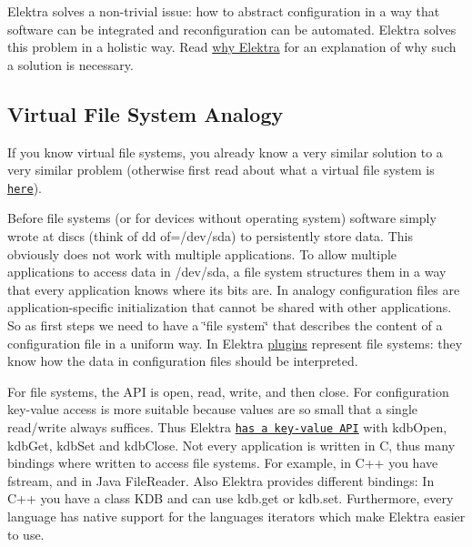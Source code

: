 Elektra solves a non-\/trivial issue\+: how to abstract configuration in a way that software can be integrated and reconfiguration can be automated. Elektra solves this problem in a holistic way. Read \hyperlink{doc_WHY_md}{why Elektra} for an explanation of why such a solution is necessary.

\subsection*{Virtual File System Analogy}

If you know virtual file systems, you already know a very similar solution to a very similar problem (otherwise first read about what a virtual file system is \href{https://en.wikipedia.org/wiki/Virtual_file_system}{\tt here}).

Before file systems (or for devices without operating system) software simply wrote at discs (think of {\ttfamily dd of=/dev/sda}) to persistently store data. This obviously does not work with multiple applications. To allow multiple applications to access data in {\ttfamily /dev/sda}, a file system structures them in a way that every application knows where its bits are. In analogy configuration files are application-\/specific initialization that cannot be shared with other applications. So as first steps we need to have a \char`\"{}file system\char`\"{} that describes the content of a configuration file in a uniform way. In Elektra \hyperlink{md_src_plugins_README_src_plugins_README_md}{plugins} represent file systems\+: they know how the data in configuration files should be interpreted.

For file systems, the A\+PI is {\ttfamily open}, {\ttfamily read}, {\ttfamily write}, and then {\ttfamily close}. For configuration key-\/value access is more suitable because values are so small that a single read/write always suffices. Thus Elektra \href{https://doc.libelektra.org/api/current/html}{\tt has a key-\/value A\+PI} with {\ttfamily kdb\+Open}, {\ttfamily kdb\+Get}, {\ttfamily kdb\+Set} and {\ttfamily kdb\+Close}. Not every application is written in C, thus many {\ttfamily bindings} where written to access file systems. For example, in C++ you have {\ttfamily fstream}, and in Java {\ttfamily File\+Reader}. Also Elektra provides different bindings\+: In C++ you have a class {\ttfamily K\+DB} and can use {\ttfamily kdb.\+get} or {\ttfamily kdb.\+set}. Furthermore, every language has native support for the language\textquotesingle{}s iterators which make Elektra easier to use.

